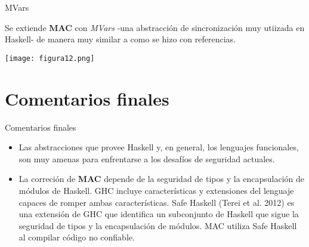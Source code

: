 \documentclass{beamer}
\begin{document}
\begin{frame}{MVars}
    \pause
    
    Se extiende \textbf{MAC} con \textit{MVars} -una abstracción de sincronización muy utiizada en Haskell- de manera muy similar a como se hizo con referencias.
    
    \pause[3]
    \begin{center}
        \texttt{[image: figura12.png]}
    \end{center}
\end{frame}

\section{Comentarios finales}

\begin{frame}{Comentarios finales}
    \pause
    \begin{itemize}
        \item<2-> Las abstracciones que provee Haskell y, en general, los lenguajes funcionales, son muy amenas para enfrentarse a los desafíos de seguridad actuales.

        \item<3-> La correción de \textbf{MAC} depende de la seguridad de tipos y la encapsulación de módulos de Haskell. GHC incluye características y extensiones del lenguaje capaces de romper ambas características. Safe Haskell (Terei et al. 2012) es una extensión de GHC que identifica un subconjunto de Haskell que sigue la seguridad de tipos y la encapsulación de módulos. MAC utiliza Safe Haskell al compilar código no confiable.
    \end{itemize}
\end{frame}
\end{document}
